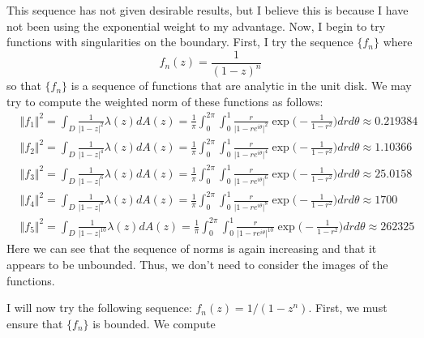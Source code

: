 \documentclass[12pt]{article}
\begin{document}
\par This sequence has not given desirable results, but I believe this is because I have not been using the exponential weight to my advantage. Now, I begin to try functions with singularities on the boundary. First, I try the sequence $\{f_n\}$ where
\[
f_n(z) = \frac{1}{(1-z)^n}
\] so that $\{f_n\}$ is a sequence of functions that are analytic in the unit disk. We may try to compute the weighted norm of these functions as follows:
\begin{align*}
&\Vert f_1 \Vert^2 = \int_D \frac{1}{\vert 1 - z \vert^2} \lambda(z) dA(z) = \frac{1}{\pi} \int_0^{2\pi} \int_0^1 \frac{r}{\vert 1 - re^{i\theta} \vert^2} \exp\bigg(-\frac{1}{1-r^2}\bigg) dr d\theta \approx 0.219384 \\
&\Vert f_2 \Vert^2 = \int_D \frac{1}{\vert 1 - z \vert^4} \lambda(z) dA(z) = \frac{1}{\pi}\int_0^{2\pi} \int_0^1 \frac{r}{\vert 1 - re^{i\theta} \vert^4} \exp\bigg(-\frac{1}{1-r^2}\bigg) dr d\theta \approx 1.10366 \\
&\Vert f_3 \Vert^2 = \int_D \frac{1}{\vert 1 - z \vert^6} \lambda(z) dA(z) = \frac{1}{\pi}\int_0^{2\pi} \int_0^1 \frac{r}{\vert 1 - re^{i\theta} \vert^6} \exp\bigg(-\frac{1}{1-r^2}\bigg) dr d\theta \approx 25.0158 \\
&\Vert f_4 \Vert^2 = \int_D \frac{1}{\vert 1 - z \vert^{8}} \lambda(z) dA(z) = \frac{1}{\pi}\int_0^{2\pi} \int_0^1 \frac{r}{\vert 1 - re^{i\theta} \vert^{8}} \exp\bigg(-\frac{1}{1-r^2}\bigg) dr d\theta \approx 1700 \\
&\Vert f_5 \Vert^2 = \int_D \frac{1}{\vert 1 - z \vert^{10}} \lambda(z) dA(z) = \frac{1}{\pi} \int_0^{2\pi} \int_0^1 \frac{r}{\vert 1 - re^{i\theta} \vert^{10}} \exp\bigg(-\frac{1}{1-r^2}\bigg) dr d\theta \approx 262325
\end{align*} Here we can see that the sequence of norms is again increasing and that it appears to be unbounded. Thus, we don't need to consider the images of the functions. 
\par I will now try the following sequence: $f_n(z) = 1/(1-z^n)$. First, we must ensure that $\{f_n\}$ is bounded. We compute
\end{document}
